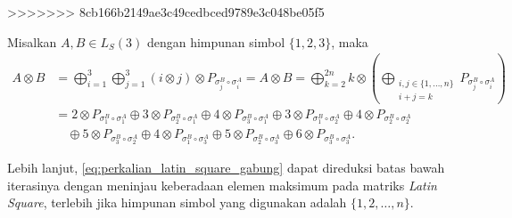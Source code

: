 >>>>>>> 8cb166b2149ae3c49cedbced9789e3c048be05f5
\begin{contoh}\label{ex:hasil_iterasi_semua}
  Misalkan $A, B \in L_S(3)$ dengan himpunan simbol $\{1, 2, 3\}$, maka
  \begin{align*}
    A \otimes B & = \bigoplus_{i=1}^{3} \bigoplus_{j=1}^{3} (i \otimes j) \otimes P_{\sigma_j^B \circ \sigma_i^A} =      A \otimes B = \bigoplus_{k=2}^{2n} k \otimes \left( \bigoplus_{\substack{i,j \in \{1,\ldots,n\} \\ i+j=k}} P_{\sigma_j^B \circ \sigma_i^A} \right) \\
                & = 2 \otimes P_{\sigma_1^B \circ \sigma_1^A} \oplus 3 \otimes P_{\sigma_2^B \circ \sigma_1^A} \oplus 4 \otimes P_{\sigma_3^B \circ \sigma_1^A} \oplus 3 \otimes P_{\sigma_1^B \circ \sigma_2^A} \oplus 4 \otimes P_{\sigma_2^B \circ \sigma_2^A}           \\
                & \quad \oplus 5 \otimes P_{\sigma_3^B \circ \sigma_2^A} \oplus 4 \otimes P_{\sigma_1^B \circ \sigma_3^A} \oplus 5 \otimes P_{\sigma_2^B \circ \sigma_3^A} \oplus 6 \otimes P_{\sigma_3^B \circ \sigma_3^A}.
  \end{align*}
\end{contoh}

Lebih lanjut, \eqref{eq:perkalian_latin_square_gabung} dapat direduksi batas bawah iterasinya dengan meninjau keberadaan elemen maksimum pada matriks \emph{Latin Square}, terlebih jika himpunan simbol yang digunakan adalah $\{1, 2, \ldots, n\}$.

